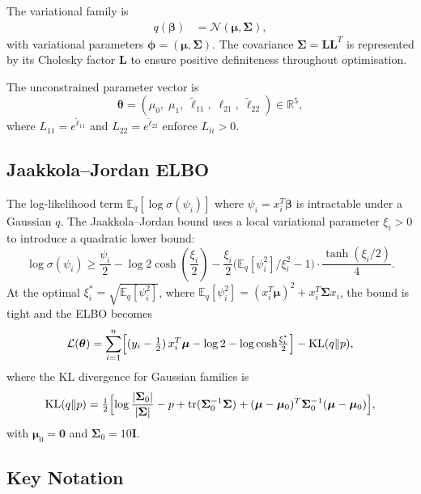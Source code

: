 \documentclass[11pt,a4paper]{article}
\newcommand{\E}{\mathbb{E}}
\newcommand{\R}{\mathbb{R}}
\newcommand{\N}{\mathcal{N}}
\newcommand{\tr}{\text{tr}}
\begin{document}
The variational family is
\begin{align}
  q(\bm{\beta}) &= \N(\bm{\mu}, \bm{\Sigma}),
\end{align}
with variational parameters $\bm{\phi} = (\bm{\mu}, \bm{\Sigma})$.
The covariance $\bm{\Sigma} = \bm{L}\bm{L}^T$ is represented by its Cholesky factor
$\bm{L}$ to ensure positive definiteness throughout optimisation.

The unconstrained parameter vector is
\begin{equation}
  \bm{\theta} = (\mu_0,\; \mu_1,\; \tilde{\ell}_{11},\; \ell_{21},\; \tilde{\ell}_{22})
  \in \R^5,
\end{equation}
where $L_{11} = e^{\tilde{\ell}_{11}}$ and $L_{22} = e^{\tilde{\ell}_{22}}$ enforce
$L_{ii} > 0$.

\subsection{Jaakkola--Jordan ELBO}

The log-likelihood term $\E_q[\log\sigma(\psi_i)]$ where $\psi_i = x_i^T\bm{\beta}$
is intractable under a Gaussian $q$.
The Jaakkola--Jordan bound uses a local variational parameter $\xi_i > 0$ to introduce
a quadratic lower bound:
\begin{equation}
  \log\sigma(\psi_i) \geq \frac{\psi_i}{2} - \log 2\cosh\!\left(\frac{\xi_i}{2}\right)
  - \frac{\xi_i}{2}\bigl(\E_q[\psi_i^2]/\xi_i^2 - 1\bigr) \cdot \frac{\tanh(\xi_i/2)}{4}.
\end{equation}
At the optimal $\xi_i^* = \sqrt{\E_q[\psi_i^2]}$, where
$\E_q[\psi_i^2] = (x_i^T\bm{\mu})^2 + x_i^T\bm{\Sigma} x_i$,
the bound is tight and the ELBO becomes
\begin{equation}\label{eq:elbo}
  \mathcal{L}(\bm{\theta}) = \sum_{i=1}^{n}
  \Bigl[(y_i - \tfrac{1}{2})\,x_i^T\bm{\mu}
        - \log 2 - \log\cosh\!\tfrac{\xi_i^*}{2}\Bigr]
  - \mathrm{KL}(q\|p),
\end{equation}
where the KL divergence for Gaussian families is
\begin{equation}
  \mathrm{KL}(q\|p) = \tfrac{1}{2}\Bigl[
    \log\frac{|\bm{\Sigma}_0|}{|\bm{\Sigma}|}
    - p + \tr(\bm{\Sigma}_0^{-1}\bm{\Sigma})
    + (\bm{\mu}-\bm{\mu}_0)^T\bm{\Sigma}_0^{-1}(\bm{\mu}-\bm{\mu}_0)
  \Bigr],
\end{equation}
with $\bm{\mu}_0=\bm{0}$ and $\bm{\Sigma}_0 = 10\bm{I}$.

\subsection{Key Notation}
\end{document}
